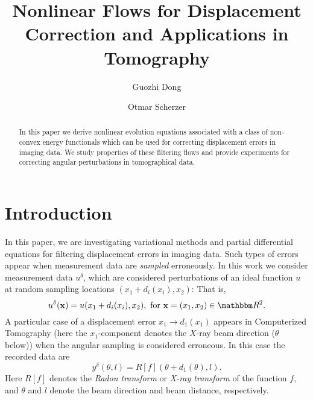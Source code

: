 \documentclass[runningheads,a4paper]{llncs}\usepackage{latexsym}
\newcommand{\R}{\mathbbm R}
\newcommand{\ud}{u^\delta}
\begin{document}
\title{Nonlinear Flows for Displacement Correction and Applications in Tomography}

\author{Guozhi Dong  \and Otmar Scherzer 
}




\maketitle


\begin{abstract}
In this paper we derive nonlinear evolution equations associated 
with a class of non-convex energy functionals which can be used for 
correcting displacement errors in imaging data.
We study properties of these filtering flows 
and provide experiments for correcting angular perturbations 
in tomographical data.
\end{abstract}

\section{Introduction}
In this paper, we are investigating variational methods and partial differential equations for filtering displacement errors 
in imaging data. Such types of errors appear when measurement data are \emph{sampled} erroneously. 
In this work we consider measurement data $\ud$, which are considered perturbations of 
an ideal function $u$ at random sampling locations $(x_1+d_i(x_i),x_2)$: That is, 
\begin{equation}
\label{eq:dis_function}
\ud(\mathbf{x})=u(x_1+d_i(x_i),x_2), \text{ for } \mathbf{x}=(x_1,x_2)\in  \R^2.
\end{equation}
A particular case of a displacement error $x_1 \to d_1(x_1)$ appears in Computerized Tomography 
(here the $x_1$-component denotes the $X$-ray beam direction ($\theta$ below)) when the angular sampling 
is considered erroneous. In this case the recorded data are
\begin{equation}
\label{eq:angle_dis}
y^\delta (\theta,l)=R[f](\theta+d_1(\theta),l).
\end{equation}
Here $R[f]$ denotes the \emph{Radon transform} or \emph{X-ray transform} of the function $f$, 
and $\theta$ and $l$ denote the beam direction and beam distance, respectively.
\end{document}
